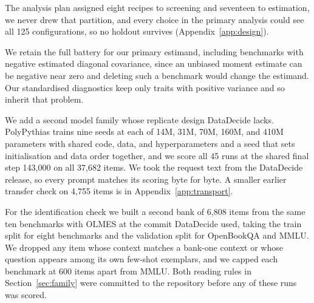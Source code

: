 The analysis plan assigned eight recipes to screening and seventeen to estimation, we never drew that partition, and every choice in the primary analysis could see all 125 configurations, so no holdout survives (Appendix~\ref{app:design}).

We retain the full battery for our primary estimand, including benchmarks with negative estimated diagonal covariance, since an unbiased moment estimate can be negative near zero and deleting such a benchmark would change the estimand. Our standardised diagnostics keep only traits with positive variance and so inherit that problem.

We add a second model family whose replicate design DataDecide lacks. PolyPythias \citep{vanderwal2025} trains nine seeds at each of 14M, 31M, 70M, 160M, and 410M parameters with shared code, data, and hyperparameters and a seed that sets initialisation and data order together, and we score all 45 runs at the shared final step 143,000 on all 37,682 items. We took the request text from the DataDecide release, so every prompt matches its scoring byte for byte. A smaller earlier transfer check on 4,755 items is in Appendix~\ref{app:transport}.

For the identification check we built a second bank of 6,808 items from the same ten benchmarks with OLMES at the commit DataDecide used, taking the train split for eight benchmarks and the validation split for OpenBookQA and MMLU. We dropped any item whose context matches a bank-one context or whose question appears among its own few-shot exemplars, and we capped each benchmark at 600 items apart from MMLU. Both reading rules in Section~\ref{sec:family} were committed to the repository before any of these runs was scored.

